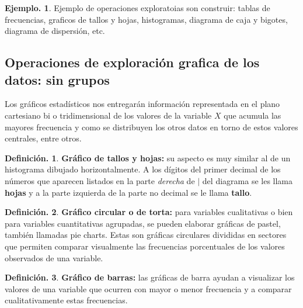 \documentclass[]{book}
\theoremstyle{definition}
\newtheorem{definition}{Definición.}[chapter]
\theoremstyle{definition}
\newtheorem{example}{Ejemplo.}[chapter]
\theoremstyle{definition}
\theoremstyle{remark}
\begin{document}
\begin{example}
\protect\hypertarget{exm:unnamed-chunk-39}{}{\label{exm:unnamed-chunk-39} }Ejemplo de operaciones exploratoias son construir: tablas
de frecuencias, graficos de tallos y
hojas, histogramas, diagrama de caja y bigotes, diagrama
de dispersión, etc.
\end{example}

\hypertarget{operaciones-de-exploraciuxf3n-grafica-de-los-datos-sin-grupos}{%
\subsection{Operaciones de exploración grafica de los datos: sin grupos}\label{operaciones-de-exploraciuxf3n-grafica-de-los-datos-sin-grupos}}

Los gráficos estadísticos nos entregarán información
representada en el plano cartesiano bi o
tridimensional de los valores de la variable \(X\) que
acumula las mayores frecuencia y como se
distribuyen los otros datos en torno de estos valores
centrales, entre otros.

\begin{definition}
\protect\hypertarget{def:unnamed-chunk-41}{}{\label{def:unnamed-chunk-41} }
\textbf{Gráfico de tallos y hojas:} su aspecto es muy similar al de un
histograma dibujado horizontalmente. A los dígitos del primer
decimal de los números que aparecen listados en la parte
\emph{derecha} de \(|\) del diagrama se les llama \textbf{hojas} y a la parte
izquierda de la parte no decimal se le llama \textbf{tallo}.
\end{definition}

\begin{definition}
\protect\hypertarget{def:unnamed-chunk-42}{}{\label{def:unnamed-chunk-42} }\textbf{Gráfico circular o de torta:} para variables cualitativas o
bien para
variables cuantitativas agrupadas,
se pueden elaborar gráficas de pastel, también llamadas
pie charts. Estas son gráficas circulares divididas en sectores
que permiten comparar visualmente
las frecuencias porcentuales de los valores observados de
una variable.
\end{definition}

\begin{definition}
\protect\hypertarget{def:unnamed-chunk-43}{}{\label{def:unnamed-chunk-43} }
\textbf{Gráfico de barras:} las gráficas de barra ayudan a visualizar
los valores de una variable que
ocurren con mayor o menor frecuencia y a comparar
cualitativamente estas
frecuencias.
\end{definition}
\end{document}
